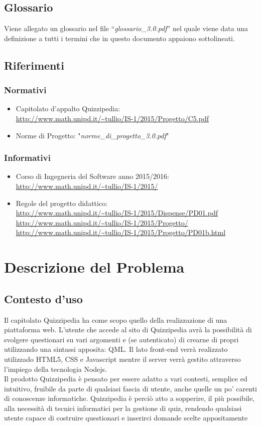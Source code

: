 \documentclass[a4paper,11pt]{article}
\begin{document}
	\subsection{Glossario}
	Viene allegato un glossario nel file ``\textit{glossario\_3.0.pdf}'' nel quale viene data una definizione a tutti i termini che in questo documento appaiono sottolineati.
	\subsection{Riferimenti}
		\subsubsection{Normativi}
		\begin{itemize}
			\item Capitolato d'appalto Quizzipedia:\\
			\url{http://www.math.unipd.it/~tullio/IS-1/2015/Progetto/C5.pdf}
			\item Norme di Progetto: "\textit{norme\_di\_progetto\_3.0.pdf}"
		\end{itemize}
		\subsubsection{Informativi}
		\begin{itemize}
			\item Corso di Ingegneria del Software anno 2015/2016:\\
			\url{http://www.math.unipd.it/~tullio/IS-1/2015/}
			\item Regole del progetto didattico:\\
			\url{http://www.math.unipd.it/~tullio/IS-1/2015/Dispense/PD01.pdf}
			\url{http://www.math.unipd.it/~tullio/IS-1/2015/Progetto/}\\
			\url{http://www.math.unipd.it/~tullio/IS-1/2015/Progetto/PD01b.html}
		\end{itemize}
	\pagebreak

	\newpage	
	\section{Descrizione del Problema}
	\subsection{Contesto d'uso}
		Il capitolato Quizzipedia ha come scopo quello della realizzazione di una piattaforma web. L'utente che accede al sito di Quizzipedia avrà la possibilità di svolgere questionari su vari argomenti e (se autenticato) di crearne di propri utilizzando una sintassi apposita: QML. Il lato front-end verrà realizzato utilizzado HTML5, CSS e Javascript mentre il server verrà gestito attraverso l'impiego della tecnologia Nodejs.\\
		Il prodotto Quizzipedia è pensato per essere adatto a vari contesti, semplice ed intuitivo, fruibile da parte di qualsiasi fascia di utente, anche quelle un po' carenti di conoscenze informatiche. Quizzipedia è perciò atto a sopperire, il più possibile, alla necessità di tecnici informatici per la gestione di quiz, rendendo qualsiasi utente capace di costruire questionari e inserirci domande scelte appositamente
\end{document}
